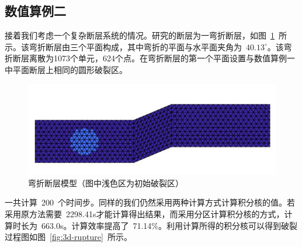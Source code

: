    
		\subsection{数值算例二}
    \indent 接着我们考虑一个复杂断层系统的情况。研究的断层为一弯折断层，如图~\ref{fig:rupture-model2}~所示。该弯折断层由三个平面构成，其中弯折的平面与水平面夹角为~$40.13^{\circ}$。该弯折断层离散为1073个单元，624个点。在弯折断层的第一个平面设置与数值算例一中平面断层上相同的圆形破裂区。
    
    \begin{figure}[H]
 \centerin
  \includegraphics[width=0.8\linewidth]{img/3Druptuerprocess_step1.png}
    \caption{ 弯折断层模型（图中浅色区为初始破裂区）} \label{fig:rupture-model2}
  \end{figure}
 \indent 一共计算~200~个时间步。同样的我们仍然采用两种计算方式计算积分核的值。若采用原方法需要~2298.41s才能计算得出结果，而采用分区计算积分核的方式，计算时长为~663.0s。计算效率提高了~71.14\%。利用计算所得的积分核可以得到破裂过程图如图~\ref{fig:3d-rupture}~所示。
 
